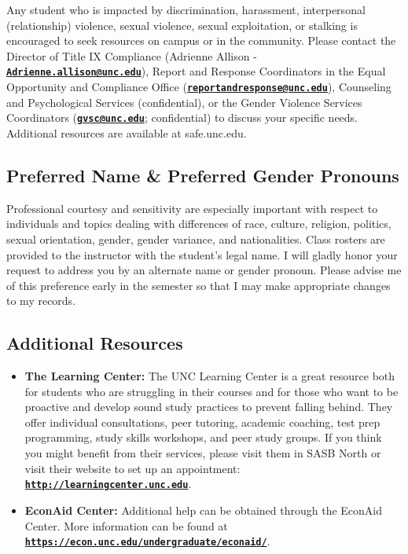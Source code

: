 \documentclass[11pt]{article}
\begin{document}
Any student who is impacted by discrimination, harassment, interpersonal (relationship) violence, sexual violence, sexual exploitation, or stalking is encouraged to seek resources on campus or in the community. Please contact the Director of Title IX Compliance (Adrienne Allison - \href{Adrienne.allison@unc.edu}{\tt\bf Adrienne.allison@unc.edu}), Report and Response Coordinators in the Equal Opportunity and Compliance Office (\href{reportandresponse@unc.edu}{\tt\bf reportandresponse@unc.edu}), Counseling and Psychological Services (confidential), or the Gender Violence Services Coordinators (\href{gvsc@unc.edu}{\tt\bf gvsc@unc.edu}; confidential) to discuss your specific needs. Additional resources are available at safe.unc.edu.

\subsection*{Preferred Name \& Preferred Gender Pronouns}
Professional courtesy and sensitivity are especially important with respect to individuals and topics dealing with differences of race, culture, religion, politics, sexual orientation, gender, gender variance, and nationalities. Class rosters are provided to the instructor with the student's legal name. I will gladly honor your request to address you by an alternate name or gender pronoun. Please advise me of this preference early in the semester so that I may make appropriate changes to my records.


\subsection*{Additional Resources}
\begin{itemize}

	\item \textbf{The Learning Center:} The UNC Learning Center is a great resource both for students who are struggling in their courses and for those who want to be proactive and develop sound study practices to prevent falling behind. They offer individual consultations, peer tutoring, academic coaching, test prep programming, study skills workshops, and peer study groups. If you think you might benefit from their services, please visit them in SASB North or visit their website to set up an appointment: \href{http://learningcenter.unc.edu}{\tt\bf http://learningcenter.unc.edu}. 
	
	\item \textbf{EconAid Center:} Additional help can be obtained through the EconAid Center. More information can be found at \href{https://econ.unc.edu/undergraduate/econaid/}{\tt\bf https://econ.unc.edu/undergraduate/econaid/}.
\end{itemize}
\end{document}
